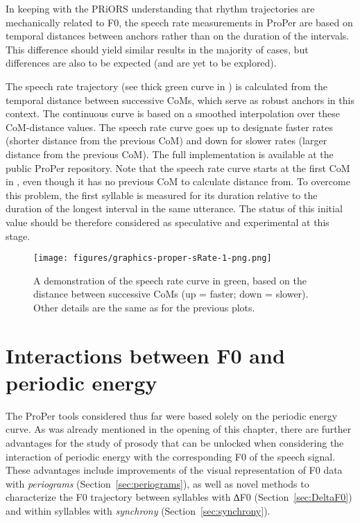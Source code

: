 In keeping with the PRiORS understanding that rhythm trajectories are mechanically related to F0,
the speech rate measurements in ProPer are based on temporal distances between anchors rather than on the duration of the intervals. This difference should yield similar results in the majority of cases, but differences are also to be expected (and are yet to be explored).

The speech rate trajectory (see thick green curve in ) is calculated from the temporal distance between successive CoMs, which serve as robust anchors in this context.
The continuous curve is based on a smoothed interpolation over these CoM-distance values.
The speech rate curve goes up to designate faster rates (shorter distance from the previous CoM) and down for slower rates (larger distance from the previous CoM).
The full implementation is available at the public ProPer repository.
Note that the speech rate curve starts at the first CoM in , even though it has no previous CoM to calculate distance from. To overcome this problem, the first syllable is measured for its duration relative to the duration of the longest interval in the same utterance. The status of this initial value should be therefore considered as speculative and experimental at this stage.

\begin{figure}
\texttt{[image: figures/graphics-proper-sRate-1-png.png]} 
\caption{A demonstration of the speech rate curve in green, based on the distance between successive CoMs (up = faster; down = slower). Other details are the same as for the previous plots.}\label{fig:proper-sRate}
\end{figure}

\section{Interactions between F0 and periodic energy}\label{sec:interactions}

The ProPer tools considered thus far were based solely on the periodic energy curve. As was already mentioned in the opening of this chapter, there are further advantages for the study of prosody that can be unlocked when considering the interaction of periodic energy with the corresponding F0 of the speech signal.
These advantages include improvements of the visual representation of F0 data with \emph{periograms} (Section~\ref{sec:periograms}), as well as novel methods to characterize the F0 trajectory between syllables with ∆F0 (Section~\ref{sec:DeltaF0}) and within syllables with \emph{synchrony} (Section~\ref{sec:synchrony}).

